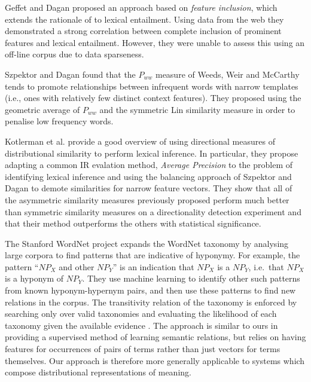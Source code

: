 \documentclass[11pt]{article}
\begin{document}
Geffet and Dagan  proposed an approach based on \emph{feature inclusion}, which extends the rationale of  to lexical entailment. Using data from the web they demonstrated a strong correlation between complete inclusion of prominent features and lexical entailment. However, they were unable to assess this using an off-line corpus due to data sparseness.

Szpektor and Dagan  found that the $P_{ww}$ measure of Weeds, Weir and McCarthy tends to promote relationships between infrequent words with narrow templates (i.e., ones with relatively few distinct context features).  They proposed using the geometric average of $P_{ww}$ and the symmetric Lin similarity measure in order to penalise low frequency words.   

Kotlerman et al.  provide a good overview of using directional measures of distributional similarity to perform lexical inference.  In particular, they propose adapting a common IR evalation method, \emph{Average Precision} to the problem of identifying lexical inference and using the balancing approach of Szpektor and Dagan  to demote similarities for narrow feature vectors.  They show that all of the asymmetric similarity measures previously proposed perform much better than symmetric similarity measures on a directionality detection experiment and that their method outperforms the others with statistical significance.

The Stanford WordNet project \cite{Snow:04} expands the WordNet
taxonomy by analysing large corpora to find patterns that are
indicative of hyponymy. For example, the pattern ``$\mathit{NP}_X$ and
other $\mathit{NP}_Y$'' is an indication that $\mathit{NP}_X$ is a
$\mathit{NP}_Y$, i.e.~that $\mathit{NP}_X$ is a hyponym of
$\mathit{NP}_Y$. They use machine learning to identify other such
patterns from known hyponym-hypernym pairs, and then use these
patterns to find new relations in the corpus. The
transitivity relation of the taxonomy is enforced by searching only over valid
taxonomies and evaluating the likelihood of each taxonomy given the
available evidence \cite{Snow:06}. The approach is similar to
ours in providing a supervised method of learning semantic relations, but relies on having features for occurrences of pairs of terms rather than just vectors for terms themselves. Our approach is therefore more generally applicable to systems which compose distributional
representations of meaning.
\end{document}
